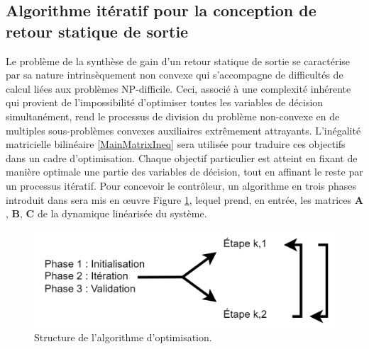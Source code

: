 \subsection{Algorithme itératif pour la conception de retour statique de sortie}
\label{3a}

Le problème de la synthèse de gain d'un retour statique de sortie se caractérise par sa nature intrinsèquement non convexe qui s'accompagne de difficultés de calcul liées aux problèmes NP-difficile. Ceci, associé à une complexité inhérente qui provient de l'impossibilité d'optimiser toutes les variables de décision simultanément, rend le processus de division du problème non-convexe en de multiples sous-problèmes convexes auxiliaires extrêmement attrayants. L'inégalité matricielle bilinéaire \eqref{MainMatrixIneq} sera utilisée pour traduire ces objectifs dans un cadre d'optimisation. Chaque objectif particulier est atteint en fixant de manière optimale une partie des variables de décision, tout en affinant le reste par un processus itératif. Pour concevoir le contrôleur, un algorithme en trois phases introduit dans \cite{Arzelier2018} sera mis en œuvre Figure \ref{AlgoPhases}, lequel prend, en entrée, les matrices $\boldsymbol{A}$, $\boldsymbol{B}$, $\boldsymbol{C}$ de la dynamique linéarisée du système.

\begin{figure}[hbt]
    \centering
      \includegraphics[width=0.6\columnwidth]{figures/LMIAlgo.png}
      \caption{Structure de l'algorithme d'optimisation.}
      \label{AlgoPhases}
\end{figure} 

